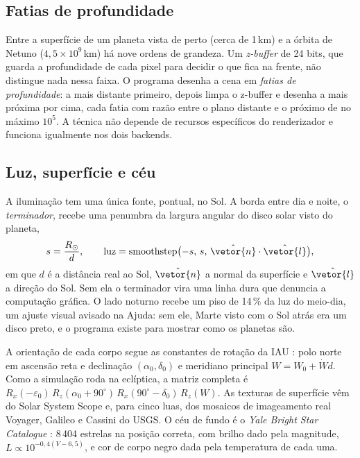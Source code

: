 \subsection{Fatias de profundidade}

Entre a superfície de um planeta vista de perto (cerca de 1\,km) e a órbita de Netuno ($4{,}5\times10^9$\,km) há nove ordens de grandeza. Um \emph{z-buffer} de 24 bits, que guarda a profundidade de cada pixel para decidir o que fica na frente, não distingue nada nessa faixa. O programa desenha a cena em \emph{fatias de profundidade}: a mais distante primeiro, depois limpa o z-buffer e desenha a mais próxima por cima, cada fatia com razão entre o plano distante e o próximo de no máximo $10^5$. A técnica não depende de recursos específicos do renderizador e funciona igualmente nos dois backends.

\subsection{Luz, superfície e céu}

A iluminação tem uma única fonte, pontual, no Sol. A borda entre dia e noite, o \emph{terminador}, recebe uma penumbra da largura angular do disco solar visto do planeta,
\begin{equation}
  s = \frac{R_\odot}{d},\qquad
  \text{luz} = \operatorname{smoothstep}\bigl(-s,\,s,\,\hat{\vetor{n}}\cdot\hat{\vetor{l}}\bigr),
\end{equation}
em que $d$ é a distância real ao Sol, $\hat{\vetor{n}}$ a normal da superfície e $\hat{\vetor{l}}$ a direção do Sol. Sem ela o terminador vira uma linha dura que denuncia a computação gráfica. O lado noturno recebe um piso de 14\,\% da luz do meio-dia, um ajuste visual avisado na Ajuda: sem ele, Marte visto com o Sol atrás era um disco preto, e o programa existe para mostrar como os planetas são.

A orientação de cada corpo segue as constantes de rotação da IAU \cite{archinal2018}: polo norte em ascensão reta e declinação $(\alpha_0,\delta_0)$ e meridiano principal $W = W_0 + \dot W d$. Como a simulação roda na eclíptica, a matriz completa é $R_x(-\varepsilon_0)\,R_z(\alpha_0 + 90^\circ)\,R_x(90^\circ - \delta_0)\,R_z(W)$. As texturas de superfície vêm do Solar System Scope e, para cinco luas, dos mosaicos de imageamento real Voyager, Galileo e Cassini do USGS. O céu de fundo é o \emph{Yale Bright Star Catalogue} \cite{hoffleit1991}: 8\,404 estrelas na posição correta, com brilho dado pela magnitude, $L\propto 10^{-0{,}4(V-6{,}5)}$, e cor de corpo negro dada pela temperatura de cada uma.

